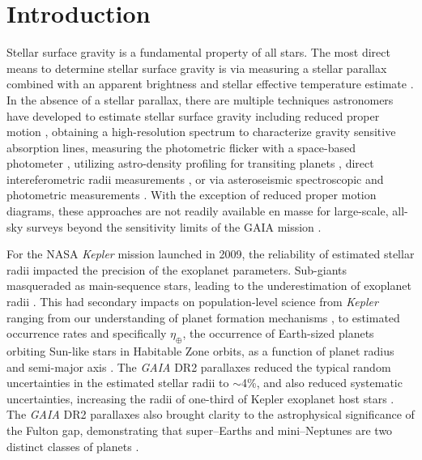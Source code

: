 \chapter{Introduction} \label{chap:introduction}

Stellar surface gravity is a fundamental property of all stars. The most direct means to determine stellar surface gravity is via measuring a stellar parallax combined with an apparent brightness and stellar effective temperature estimate \citep{GAIA,Prusti2016,Brown2016,Lindegren2016,Stassun2016}. In the absence of a stellar parallax, there are multiple techniques astronomers have developed to estimate stellar surface gravity including reduced proper motion  \citep{Lepine2011,Gould2003}, obtaining a high-resolution spectrum to characterize gravity sensitive absorption lines, measuring the photometric flicker with a space-based photometer \citep{Bastien2013,Bastien2016}, utilizing astro-density profiling for transiting planets \citep{Kipping2014}, direct intereferometric radii measurements \citep{Boyajian2012}, or via asteroseismic spectroscopic and photometric measurements \citep{Huber2014}. With the exception of reduced proper motion diagrams, these approaches are not readily available en masse for large-scale, all-sky surveys beyond the sensitivity limits of the GAIA mission \citep{GAIA}.

For the NASA \textit{Kepler} mission launched in 2009, the reliability of estimated stellar radii impacted the precision of the exoplanet parameters. Sub-giants masqueraded as main-sequence stars, leading to the underestimation of exoplanet radii \citep{Plavchan2014,Kane2014,Howell2014,Bastien2014,Mann2012}. This had secondary impacts on population-level science from \textit{Kepler} ranging from our understanding of planet formation mechanisms \citep{Lopez2013,Bodenheimer2014,Lopez2014,Schlichting2014,Rogers2015,Schlaufman2015}, to estimated occurrence rates and specifically $\eta_\oplus$, the occurrence of Earth-sized planets orbiting Sun-like stars in Habitable Zone orbits, as a function of planet radius and semi-major axis \citep{Everett2013, Plavchan2014, Zink2019, Zink2019_eta}. The \textit{GAIA} DR2 parallaxes reduced the typical random uncertainties in the estimated stellar radii to $\sim$4\%, and also reduced systematic uncertainties, increasing the radii of one-third of Kepler exoplanet host stars \citep{Bryson2020,Hsu2019,Berger2018}.  The \textit{GAIA} DR2 parallaxes also brought clarity to the astrophysical significance of the Fulton gap, demonstrating that super--Earths and mini--Neptunes are two distinct classes of planets \citep{Fulton2016,Fulton2017}. 

